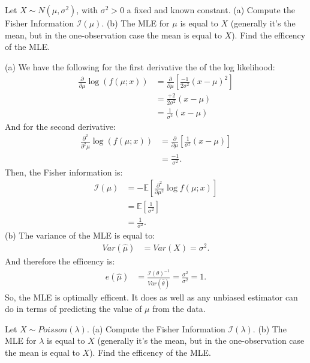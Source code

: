 
Let $X \sim N(\mu, \sigma^2)$, with $\sigma^2 > 0$ a fixed and known constant.
(a) Compute the Fisher Information $\mathcal{I}(\mu)$. (b) The MLE for $\mu$
is equal to $X$ (generally it's the mean, but in the one-observation case the
mean is equal to $X$). Find the efficency of the MLE.


(a) We have the following for the first derivative the of the log likelihood:
\begin{align*}
\frac{\partial}{\partial \mu} \log(f(\mu; x))
&= \frac{\partial}{\partial \mu} \left[ \frac{-1}{2\sigma^2} (x - \mu)^2 \right] \\
&= \frac{+2}{2\sigma^2} (x - \mu) \\
&= \frac{1}{\sigma^2} (x - \mu)
\end{align*}
And for the second derivative:
\begin{align*}
\frac{\partial^2}{\partial^2 \mu} \log(f(\mu; x))
&= \frac{\partial}{\partial \mu} \left[ \frac{1}{\sigma^2} (x - \mu) \right] \\
&= \frac{-1}{\sigma^2}.
\end{align*}
Then, the Fisher information is:
\begin{align*}
\mathcal{I}(\mu) &= - \mathbb{E} \left[ \frac{\partial^2}{\partial \mu^2} \log f(\mu; x) \right] \\
&= \mathbb{E} \left[ \frac{1}{\sigma^2} \right] \\
&= \frac{1}{\sigma^2}.
\end{align*}
(b) The variance of the MLE is equal to:
\begin{align*}
Var(\hat{\mu}) &= Var(X) = \sigma^2.
\end{align*}
And therefore the efficency is:
\begin{align*}
e(\hat{\mu}) &= \frac{\mathcal{I}(\theta)^{-1}}{Var(\widehat{\theta})} = \frac{\sigma^2}{\sigma^2} = 1.
\end{align*}
So, the MLE is optimally efficent. It does as well as any unbiased estimator can do in
terms of predicting the value of $\mu$ from the data.


Let $X \sim Poisson(\lambda)$. (a) Compute the Fisher Information $\mathcal{I}(\lambda)$.
(b) The MLE for $\lambda$ is equal to $X$ (generally it's the mean, but in the one-observation
case the mean is equal to $X$). Find the efficency of the MLE.

